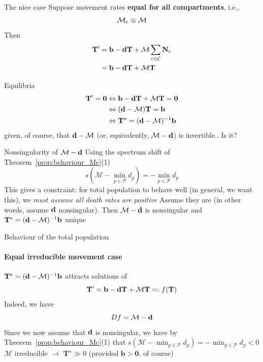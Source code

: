 \documentclass[aspectratio=43]{beamer}
\begin{document}
\begin{frame}{The nice case}
Suppose movement rates \textbf{equal for all compartments}, i.e.,
$$
\mathcal{M}_c\equiv\mathcal{M}
$$
\vfill
Then
\begin{align}
\mathbf{T}' &= \mathbf{b}-\mathbf{d}\mathbf{T}+\mathcal{M}\sum_{c\in\mathcal{C}}\mathbf{N}_{c} \nonumber \\
&= \mathbf{b}-\mathbf{d}\mathbf{T}+\mathcal{M}\mathbf{T} \label{sys:pSLIRS_toy_dN}
\end{align}
\end{frame}


\begin{frame}{Equilibria}
$$
\begin{aligned}
\bT'=\b0 &\Leftrightarrow \mathbf{b}-\bd\mathbf{T}+\mathcal{M}\mathbf{T}=\mathbf{0} \\
&\Leftrightarrow (\bd-\mathcal{M})\mathbf{T}=\mathbf{b} \\
&\Leftrightarrow \mathbf{T}^\star=(\bd-\mathcal{M})^{-1}\mathbf{b}
\end{aligned}
$$
given, of course, that $\mathbf{d}-\mathcal{M}$ (or, equivalently, $\mathcal{M}-\mathbf{d}$) is invertible.. 
\vfill
Is it?
\end{frame}

\begin{frame}{Nonsingularity of $\mathcal{M}-\mathbf{d}$}
Using the spectrum shift of Theorem~\ref{prop:behaviour_Mc}{(1)}
\[
s\left(\mathcal{M}-\min_{p\in\mathcal{P}}d_p\right)=-\min_{p\in\mathcal{P}}d_p
\]
This gives a constraint: for total population to behave well (in general, we want this), we \emph{must assume all death rates are positive}
\vfill
Assume they are (in other words, assume $\mathbf{d}$ nonsingular). Then $\mathcal{M}-\mathbf{d}$ is nonsingular and $\mathbf{T}^\star=(\mathbf{d}-\mathcal{M})^{-1}\mathbf{b}$ unique
\end{frame}


\begin{frame}{Behaviour of the total population}
\framesubtitle{Equal irreducible movement case}
$\mathbf{T}^\star=(\mathbf{d}-\mathcal{M})^{-1}\mathbf{b}$ attracts solutions of
$$
\mathbf{T}'=\mathbf{b}-\mathbf{d}\mathbf{T}+\mathcal{M}\mathbf{T}=:f(\mathbf{T})
$$
\vfill
Indeed, we have
$$
Df=\mathcal{M}-\mathbf{d}
$$
\vfill
Since we now assume that $\mathbf{d}$ is nonsingular, we have by Theorem~\ref{prop:behaviour_Mc}{(1)} that $s(\mathcal{M}-\min_{p\in\mathcal{P}}d_p)=-\min_{p\in\mathcal{P}}d_p<0$
\vfill
$\mathcal{M}$ irreducible $\rightarrow$ $\mathbf{T}^\star\gg 0$ (provided $\mathbf{b}>\mathbf{0}$, of course)
\end{frame}




\end{document}
